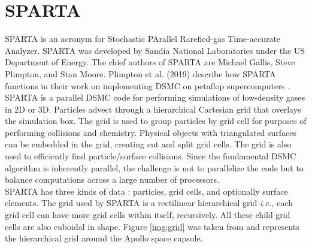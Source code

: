 \newpage
\chapter{SPARTA}

SPARTA is an acronym for Stochastic PArallel Rarefied-gas Time-accurate Analyzer. SPARTA was developed by Sandia National Laboratories under the US Department of Energy. The chief authors of SPARTA are Michael Gallis, Steve Plimpton, and Stan Moore. Plimpton et al. (2019) describe how SPARTA functions in their work on implementing DSMC on petaflop supercomputers \cite{plimpton2019direct}. \\

\no SPARTA is a parallel DSMC code for performing simulations of low-density gases in 2D or 3D. Particles advect through a hierarchical Cartesian grid that overlays the simulation box. The grid is used to group particles by grid cell for purposes of performing collisions and chemistry. Physical objects with triangulated surfaces can be embedded in the grid, creating cut and split grid cells. The grid is also used to efficiently find particle/surface collisions. Since the fundamental DSMC algorithm is inherently parallel, the challenge is not to parallelize the code but to balance computations across a large number of processors. \\

\no SPARTA has three kinds of data : particles, grid cells, and optionally surface elements. The grid used by SPARTA is a rectilinear hierarchical grid \textit{i.e.,} each grid cell can have more grid cells within itself, recursively. All these child grid cells are also cuboidal in shape. Figure \ref{img:grid} was taken from \cite{plimpton2019direct} and represents the hierarchical grid around the Apollo space capsule.

